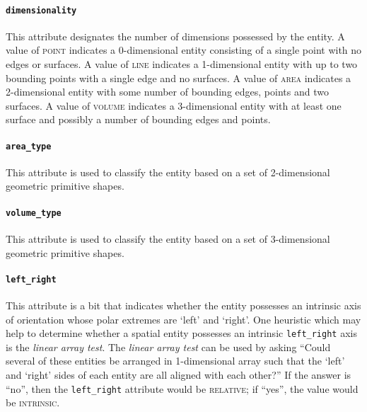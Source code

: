 \documentclass[11pt]{article}
\begin{document}
\paragraph{\texttt{dimensionality}} %
\label{par:dimensionality}
This attribute designates the number of dimensions possessed by the entity. A value of \textsc{point} indicates a 0-dimensional entity consisting of a single point with no edges or surfaces. A value of \textsc{line} indicates a 1-dimensional entity with up to two bounding points with a single edge and no surfaces. A value of \textsc{area} indicates a 2-dimensional entity with some number of bounding edges, points and two surfaces. A value of \textsc{volume} indicates a 3-dimensional entity with at least one surface and possibly a number of bounding edges and points.

\paragraph{\texttt{area\_type}} %
\label{par:area_type}
This attribute is used to classify the entity based on a set of 2-dimensional geometric primitive shapes.

\paragraph{\texttt{volume\_type}} %
\label{par:volume_type}
This attribute is used to classify the entity based on a set of 3-dimensional geometric primitive shapes.

\paragraph{\texttt{left\_right}} %
\label{par:left_right}
This attribute is a bit that indicates whether the entity possesses an intrinsic axis of orientation whose polar extremes are `left' and `right'. One heuristic which may help to determine whether a spatial entity possesses an intrinsic \texttt{left\_right} axis is the \emph{linear array test}. The \emph{linear array test} can be used by asking ``Could several of these entities be arranged in 1-dimensional array such that the `left' and `right' sides of each entity are all aligned with each other?'' If the answer is ``no'', then the \texttt{left\_right} attribute would be \textsc{relative}; if ``yes'', the value would be \textsc{intrinsic}.
\end{document}
